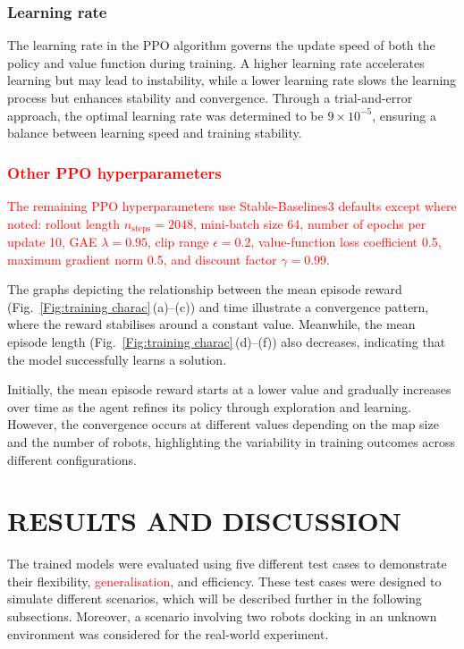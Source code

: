 \documentclass[journal]{IEEEtran}
\begin{document}
\subsubsection{Learning rate}
The learning rate in the PPO algorithm governs the update speed of both the policy and value function during training. A higher learning rate accelerates learning but may lead to instability, while a lower learning rate slows the learning process but enhances stability and convergence. Through a trial-and-error approach, the optimal learning rate was determined to be $9 \times 10^{-5}$, ensuring a balance between learning speed and training stability.

\textcolor{red}{\subsubsection{Other PPO hyperparameters} The remaining PPO hyperparameters use Stable-Baselines3 defaults except where noted: rollout length $n_\text{steps} = 2048$, mini-batch size 64, number of epochs per update 10, GAE $\lambda = 0.95$, clip range $\epsilon = 0.2$, value-function loss coefficient 0.5, maximum gradient norm 0.5, and discount factor $\gamma = 0.99$.}

The graphs depicting the relationship between the mean episode reward (Fig.~\ref{Fig:training charac}\,(a)--(c)) and time illustrate a convergence pattern, where the reward stabilises around a constant value. Meanwhile, the mean episode length (Fig.~\ref{Fig:training charac}\,(d)--(f)) also decreases, indicating that the model successfully learns a solution.

Initially, the mean episode reward starts at a lower value and gradually increases over time as the agent refines its policy through exploration and learning. However, the convergence occurs at different values depending on the map size and the number of robots, highlighting the variability in training outcomes across different configurations.

\section{RESULTS AND DISCUSSION}
The trained models were evaluated using five different test cases to demonstrate their flexibility, \textcolor{red}{generalisation}, and efficiency. These test cases were designed to simulate different scenarios, which will be described further in the following subsections. Moreover, a scenario involving two robots docking in an unknown environment was considered for the real-world experiment.
\end{document}
